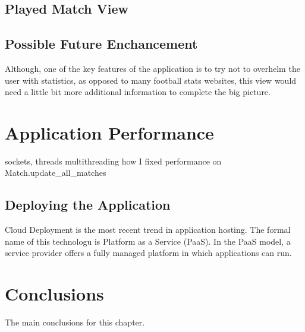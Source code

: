 \subsection{Played Match View}
\label{subsec:playedmatchview}

\subsection{Possible Future Enchancement}
\label{subsec:enchancement}

Although, one of the key features of the application is to try not to overhelm the user with statistics, as opposed to many football stats websites, this view would need a little bit more additional information to complete the big picture.

\section{Application Performance}
sockets, threads
multithreading
how I fixed performance on Match.update\_all\_matches

\subsection{Deploying the Application}
Cloud Deployment is the most recent trend in application hosting. The formal name of this technologu is Platform as a Service (PaaS).  In the PaaS model, a service provider offers a fully managed platform in which applications can run.

\section{Conclusions}
The main conclusions for this chapter.